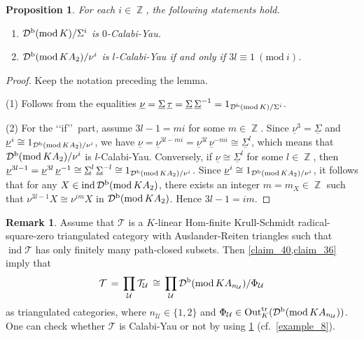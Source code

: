\documentclass[12pt]{amsart}
\numberwithin{equation}{subsection}
\theoremstyle{plain}
\newtheorem{proposition}[theorem]{Proposition}
\theoremstyle{definition}
\newtheorem{remark}[theorem]{Remark}
\renewcommand{\mod}{\mathrm{mod}\,}
\newcommand{\ind}{\operatorname{ind}}
\newcommand{\Z}{\operatorname{\mathbb{Z}}\nolimits}
\newcommand{\T}{\mathcal{T}}
\newcommand{\U}{\mathcal{U}}
\newcommand{\D}{\mathcal{D}}
\newcommand{\Out}{\mathrm{Out}^{\rm tr}_K}
\begin{document}
\begin{proposition}\label{claim_42}
For each $i\in\Z$, the following statements hold. 
\begin{enumerate}
\item $\D^{\rm b}(\mod K)/\Sigma^i$ is $0$-Calabi-Yau.
\item $\D^{\rm b}(\mod KA_2)/\nu^i$ is $l$-Calabi-Yau if and only if $3l\equiv 1\ (\mathrm{mod}\ i)$.
\end{enumerate}
\end{proposition}
\begin{proof} 
Keep the notation preceding the lemma.



(1) Follows from the equalities $\underline{\nu}= \underline{\Sigma}\,\underline{\tau}=\underline{\Sigma}\,\underline{\Sigma}^{-1}=1_{\D^{\rm b}(\mod K)/\Sigma^i}$. 



(2) For the \lq\lq if\rq\rq~part, assume $3l-1=mi$ for some $m\in\Z$.
Since  $\underline{\nu}^3=\underline{\Sigma}$ and $\underline{\nu}^i\cong 1_{\D^{\rm b}(\mod KA_2)/\nu^i}$, we have $\underline{\nu} = \underline{\nu}^{3l-mi} = \underline{\nu}^{3l}\,\underline{\nu}^{-mi} \cong \underline{\Sigma}^l$, which means that $\D^{\rm b}(\mod KA_2)/\nu^i$ is $l$-Calabi-Yau.
Conversely, if $\underline{\nu} \cong \underline{\Sigma}^l$ for some $l\in\Z$, then $\underline{\nu}^{3l-1} = \underline{\nu}^{3l}\,\underline{\nu}^{-1} \cong \underline{\Sigma}^l\,\underline{\Sigma}^{-l}\cong 1_{\D^{\rm b}(\mod KA_2)/\nu^i}$.
Since $\underline{\nu}^i\cong 1_{\D^{\rm b}(\mod KA_2)/\nu^i}$, it follows that for any $X\in\ind\D^{\rm b}(\mod KA_2)$, there exists an integer $m=m_X\in\Z$ such that $\nu^{3l-1} X \cong \nu^{im}X$ in $\D^{\rm b}(\mod KA_2)$.
Hence $3l-1=im$.
\end{proof}






\begin{remark}\label{remark_3}
Assume that $\T$ is a $K$-linear Hom-finite Krull-Schmidt radical-square-zero triangulated category with Auslander-Reiten triangles such that $\ind\T$  has only finitely many path-closed subsets.
Then \cref{claim_40,claim_36} imply that 
\begin{align}    
\T\,=\,\prod_{\U}\T_\U \,\cong\, \prod_{\U} \D^{\rm b}(\mod KA_{n_\U})/\Phi_\U
\end{align}
as triangulated categories, where $n_\U\in\{1,2\}$ and $\Phi_\U\in \Out(\D^{\rm b}(\mod KA_{n_\U}))$.
One can check whether $\T$ is Calabi-Yau or not by using \cref{claim_42} (cf.~\cref{example_8}).
\end{remark}
\end{document}
